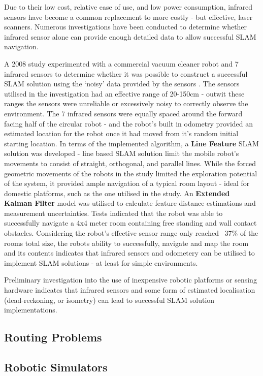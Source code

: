 Due to their low cost, relative ease of use, and low power consumption,
infrared sensors have become a common replacement to more costly - but
effective, laser scanners.
Numerous investigations have been conducted to determine whether infrared
sensor alone can provide enough detailed data to allow successful SLAM
navigation.

A 2008 study experimented with a commercial vacuum cleaner robot and 7 infrared
sensors to determine whether it was possible to construct a successful SLAM
solution using the `noisy' data provided by the sensors \cite{Choi2008}.
The sensors utilised in the investigation had an effective range of 20-150cm -
outwit these ranges the sensors were unreliable or excessively noisy to
correctly observe the environment.
The 7 infrared sensors were equally spaced around the forward facing half of
the circular robot - and the robot's built in odometry provided an estimated
location for the robot once it had moved from it's random initial starting
location.
In terms of the implemented algorithm, a {\bf Line Feature} SLAM solution was
developed - line based SLAM solution limit the mobile robot's movements to
consist of straight, orthogonal, and parallel lines.
While the forced geometric movements of the robots in the study limited the
exploration potential of the system, it provided ample navigation of a typical
room layout - ideal for domestic platforms, such as the one utilised in the
study.
An {\bf Extended Kalman Filter} model was utilised to calculate feature
distance estimations and measurement uncertainties.
Tests indicated that the  robot was able to successfully navigate a 4x4 meter
room containing free standing and wall contact obstacles.
Considering the robot's effective sensor range only reached ~37\% of the rooms
total size, the robots ability to successfully, navigate and map the room and
its contents indicates that infrared sensors and odometery can be utilised to
implement SLAM solutions - at least for simple environments.

Preliminary investigation into the use of inexpensive robotic platforms or
sensing hardware indicates that infrared sensors and some form of estimated
localisation (dead-reckoning, or isometry) can lead to successful SLAM solution
implementations.


\subsection{Routing Problems}

\subsection{Robotic Simulators}



